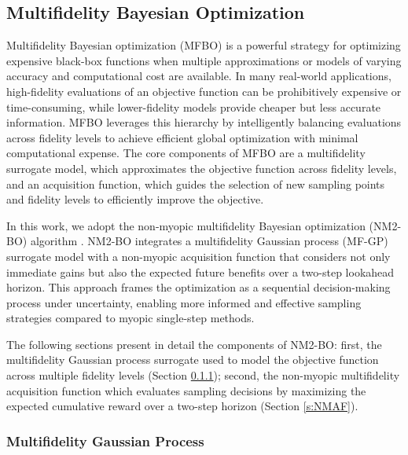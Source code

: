 \subsection{Multifidelity Bayesian Optimization}

Multifidelity Bayesian optimization (MFBO) is a powerful strategy for optimizing expensive black-box functions when multiple approximations or models of varying accuracy and computational cost are available. In many real-world applications, high-fidelity evaluations of an objective function can be prohibitively expensive or time-consuming, while lower-fidelity models provide cheaper but less accurate information. MFBO leverages this hierarchy by intelligently balancing evaluations across fidelity levels to achieve efficient global optimization with minimal computational expense. The core components of MFBO are a multifidelity surrogate model, which approximates the objective function across fidelity levels, and an acquisition function, which guides the selection of new sampling points and fidelity levels to efficiently improve the objective.

In this work, we adopt the non-myopic multifidelity Bayesian optimization (NM2-BO) algorithm \cite{DiFioreMaininiNM2BO}. NM2-BO integrates a multifidelity Gaussian process (MF-GP) surrogate model with a non-myopic acquisition function that considers not only immediate gains but also the expected future benefits over a two-step lookahead horizon. This approach frames the optimization as a sequential decision-making process under uncertainty, enabling more informed and effective sampling strategies compared to myopic single-step methods.

The following sections present in detail the components of NM2-BO: first, the multifidelity Gaussian process surrogate used to model the objective function across multiple fidelity levels (Section \ref{s:MFGP}); second, the non-myopic multifidelity acquisition function which evaluates sampling decisions by maximizing the expected cumulative reward over a two-step horizon (Section \ref{s:NMAF}).





\subsubsection{Multifidelity Gaussian Process}
\label{s:MFGP}

